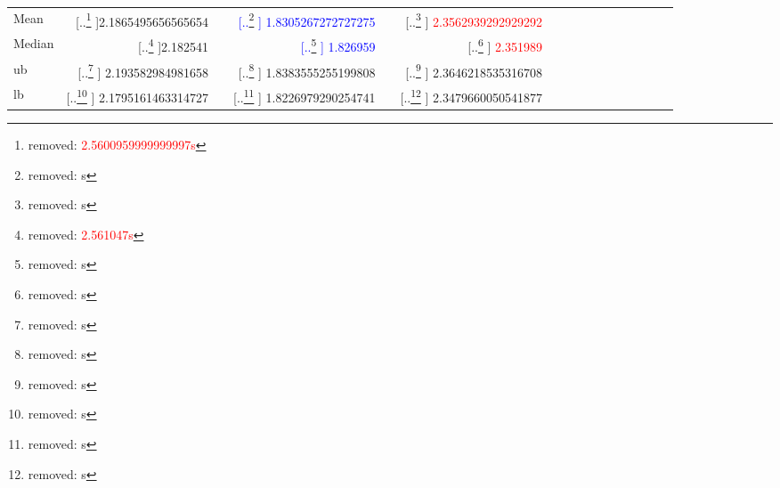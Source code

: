 \documentclass[acmsmall,review,anonymous]{acmart}\settopmatter{printfolios=true,printccs=false,printacmref=false}
\newcommand{\fnumthree}[1]{ {\num[round-mode=places,round-precision=3, scientific-notation=false]{#1}}}
\providecommand{\DIFaddtex}[1]{{\protect\color{blue} \sf #1}} %
\providecommand{\DIFdeltex}[1]{{\protect\color{red} [..\footnote{removed: #1} ]}} %
\providecommand{\DIFaddFL}[1]{\DIFadd{#1}} %
\providecommand{\DIFdelFL}[1]{\DIFdel{#1}} %
\providecommand{\DIFaddbeginFL}{} %
\providecommand{\DIFaddendFL}{} %
\providecommand{\DIFdelbeginFL}{} %
\providecommand{\DIFdelendFL}{} %
\providecommand{\DIFadd}[1]{\texorpdfstring{\DIFaddtex{#1}}{#1}} %
\providecommand{\DIFdel}[1]{\texorpdfstring{\DIFdeltex{#1}}{}} %
\newcommand{\DIFscaledelfig}{0.5}
\newlength{\DIFdelgraphicswidth} %
\newlength{\DIFdelgraphicsheight} %
\newcommand{\DIFaddincludegraphics}[2][]{{\color{blue}\fbox{\DIFOincludegraphics[#1]{#2}}}} %
\newcommand{\DIFdelincludegraphics}[2][]{%
\sbox{\DIFdelgraphicsbox}{\DIFOincludegraphics[#1]{#2}}%
\settoboxwidth{\DIFdelgraphicswidth}{\DIFdelgraphicsbox} %
\settoboxtotalheight{\DIFdelgraphicsheight}{\DIFdelgraphicsbox} %
\scalebox{\DIFscaledelfig}{%
\parbox[b]{\DIFdelgraphicswidth}{\usebox{\DIFdelgraphicsbox}\\[-\baselineskip] \rule{\DIFdelgraphicswidth}{0em}}\llap{\resizebox{\DIFdelgraphicswidth}{\DIFdelgraphicsheight}{%
\setlength{\unitlength}{\DIFdelgraphicswidth}%
\begin{picture}(1,1)%
\thicklines\linethickness{2pt} %
{\color[rgb]{1,0,0}\put(0,0){\framebox(1,1){}}}%
{\color[rgb]{1,0,0}\put(0,0){\line( 1,1){1}}}%
{\color[rgb]{1,0,0}\put(0,1){\line(1,-1){1}}}%
\end{picture}%
}\hspace*{3pt}}} %
} %
\DeclareRobustCommand{\DIFaddbeginFL}{\DIFOaddbeginFL \let\includegraphics\DIFaddincludegraphics} %
\DeclareRobustCommand{\DIFaddendFL}{\DIFOaddendFL \let\includegraphics\DIFOincludegraphics} %
\DeclareRobustCommand{\DIFdelbeginFL}{\DIFOdelbeginFL \let\includegraphics\DIFdelincludegraphics} %
\DeclareRobustCommand{\DIFdelendFL}{\DIFOaddendFL \let\includegraphics\DIFOincludegraphics} %
\begin{document}
\begin{table}
\begin{tabular}{@{}p{0.6in}rcrcrcrcrcrcrcr@{}}
Mean   &  \DIFdelbeginFL \DIFdelFL{\textcolor{red}{\fnumthree{2.5600959999999997}s}  
        }\DIFdelendFL \DIFaddbeginFL {\fnumthree{2.1865495656565654}}  
        \DIFaddendFL &&  \textcolor{blue}{\DIFdelbeginFL %
\DIFdelFL{s}\DIFdelendFL \DIFaddbeginFL \fnumthree{1.8305267272727275}\DIFaddendFL }
		&&  \DIFdelbeginFL %
\DIFdelFL{s
		}\DIFdelendFL \DIFaddbeginFL \DIFaddFL{\textcolor{red}{\fnumthree{2.3562939292929292}}
		}\DIFaddendFL \\
Median &  \DIFdelbeginFL \DIFdelFL{\textcolor{red}{\fnumthree{2.561047}s}
        }\DIFdelendFL \DIFaddbeginFL {\fnumthree{2.182541}}
        \DIFaddendFL &&   \textcolor{blue}{\DIFdelbeginFL %
\DIFdelFL{s}\DIFdelendFL \DIFaddbeginFL \fnumthree{1.826959}\DIFaddendFL }
		&& \DIFdelbeginFL %
\DIFdelFL{s
		}\DIFdelendFL \DIFaddbeginFL \DIFaddFL{\textcolor{red}{\fnumthree{2.351989}}
		}\DIFaddendFL \\
ub        &  \DIFdelbeginFL %
\DIFdelFL{s
              }\DIFdelendFL \DIFaddbeginFL \fnumthree{2.193582984981658}
              \DIFaddendFL &&  \DIFdelbeginFL %
\DIFdelFL{s
			  }\DIFdelendFL \DIFaddbeginFL \fnumthree{1.8383555255199808}
			  \DIFaddendFL &&  \DIFdelbeginFL %
\DIFdelFL{s
			   }\DIFdelendFL \DIFaddbeginFL \fnumthree{2.3646218535316708}
			   \DIFaddendFL \\
lb         &  \DIFdelbeginFL %
\DIFdelFL{s
              }\DIFdelendFL \DIFaddbeginFL \fnumthree{2.1795161463314727}
              \DIFaddendFL &&  \DIFdelbeginFL %
\DIFdelFL{s
			  }\DIFdelendFL \DIFaddbeginFL \fnumthree{1.8226979290254741}
			  \DIFaddendFL &&  \DIFdelbeginFL %
\DIFdelFL{s
			   }\DIFdelendFL \DIFaddbeginFL \fnumthree{2.3479660050541877}
			   \DIFaddendFL \\
\bottomrule
\end{tabular}
\label{table:global-blog-traversals}
\end{table}
\end{document}
